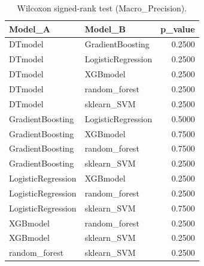 \begin{table}[t]
\centering
\begin{tabular}{llr}
\toprule
Model_A & Model_B & p_value \\
\midrule
DTmodel & GradientBoosting & 0.2500 \\
DTmodel & LogisticRegression & 0.2500 \\
DTmodel & XGBmodel & 0.2500 \\
DTmodel & random_forest & 0.2500 \\
DTmodel & sklearn_SVM & 0.2500 \\
GradientBoosting & LogisticRegression & 0.5000 \\
GradientBoosting & XGBmodel & 0.7500 \\
GradientBoosting & random_forest & 0.7500 \\
GradientBoosting & sklearn_SVM & 0.2500 \\
LogisticRegression & XGBmodel & 0.2500 \\
LogisticRegression & random_forest & 0.2500 \\
LogisticRegression & sklearn_SVM & 0.7500 \\
XGBmodel & random_forest & 0.2500 \\
XGBmodel & sklearn_SVM & 0.2500 \\
random_forest & sklearn_SVM & 0.2500 \\
\bottomrule
\end{tabular}
\caption{Wilcoxon signed-rank test (Macro_Precision).}
\label{tab:wilcoxon_Macro_Precision}
\end{table}